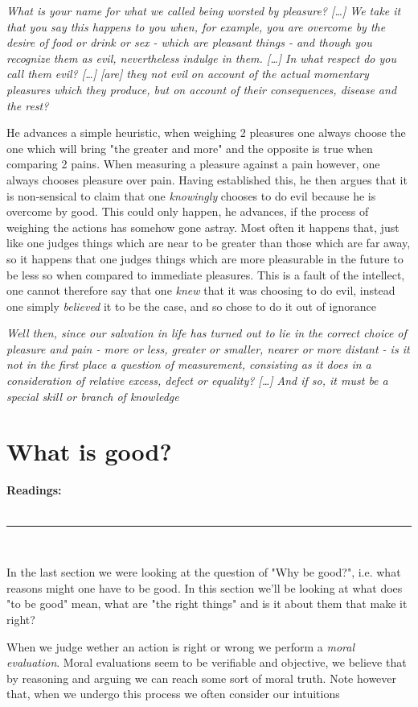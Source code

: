 \documentclass[english,course]{Notes}
\newcommand{\ita}[1]{\textit{#1}}
\newcommand\readings{\textbf{Readings:} \\}
\newcommand\sep{\\ \noindent\rule{10cm}{0.8pt} \\}
\newcommand\quo[1]{\begin{displayquote}\ita{\large{#1}}\end{displayquote}}
\begin{document}
{{\quo{What is your name for what we called being worsted by pleasure? [\dots] We take it that you say this happens to you when, for example, you are overcome by the desire of food or drink or sex - which are pleasant things - and though you recognize them as evil, nevertheless indulge in them. [\dots] In what respect do you call them evil? [\dots] [are] they not evil on account of the actual momentary pleasures which they produce, but on account of their consequences, disease and the rest?}

\par{He advances a simple heuristic, when weighing 2 pleasures one always choose the one which will bring "the greater and more" and the opposite is true when comparing 2 pains. When measuring a pleasure against a pain however, one always chooses pleasure over pain. Having established this, he then argues that it is non-sensical to claim that one \ita{knowingly} chooses to do evil because he is overcome by good. This could only happen, he advances, if the process of weighing the actions has somehow gone astray. Most often it happens that, just like one judges things which are near to be greater than those which are far away, so it happens that one judges things which are more pleasurable in the future to be less so when compared to immediate pleasures. This is a fault of the intellect, one cannot therefore say that one \ita{knew} that it was choosing to do evil, instead one simply \ita{believed} it to be the case, and so chose to do it out of ignorance}
\newpage
\quo{Well then, since our salvation in life has turned out to lie in the correct choice of pleasure and pain - more or less, greater or smaller, nearer or more distant - is it not in the first place a question of measurement, consisting as it does in a consideration of relative excess, defect or equality? [\dots] And if so, it must be a special skill or branch of knowledge}

\newpage

\section{What is good?}

\readings \cite[Chapter 2]{driver_2014} 
\sep

\par{In the last section we were looking at the question of "Why be good?", i.e. what reasons might one have to be good. In this section we'll be looking at what does "to be good" mean, what are "the right things" and is it about them that make it right?}
\par{ When we judge wether an action is right or wrong we perform a \ita{moral evaluation}. Moral evaluations seem to be verifiable and objective, we believe that by reasoning and arguing we can reach some sort of moral truth. Note however that, when we undergo this process we often consider our intuitions}

}}
\end{document}
